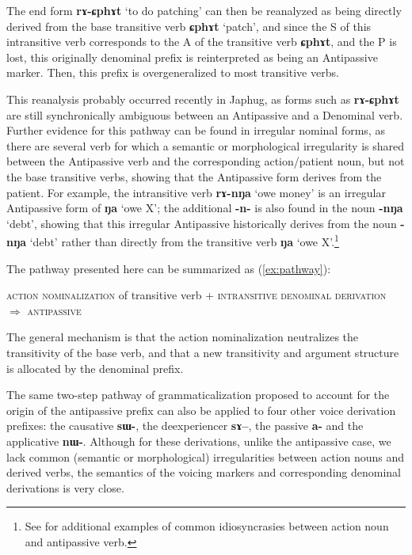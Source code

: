 \documentclass[oldfontcommands,oneside,a4paper,11pt]{article}
\newcommand{\ipa}[1]{\mbox{\phon\textbf{#1}}} %
\begin{document}
The end form \ipa{rɤ-ɕphɤt} `to do patching' can then be reanalyzed as being directly derived from the base transitive verb \ipa{ɕphɤt} `patch', and since the S of this intransitive verb corresponds to the A of the transitive verb \ipa{ɕphɤt}, and the P is lost, this originally denominal prefix is reinterpreted as being an Antipassive marker. Then, this prefix is overgeneralized to most transitive verbs.

This reanalysis probably occurred recently in Japhug, as forms such as \ipa{rɤ-ɕphɤt} are still synchronically ambiguous between an Antipassive and a Denominal verb. Further evidence for this pathway can be found in irregular nominal forms, as there are several verb for which a semantic or morphological irregularity is shared between the Antipassive verb and the corresponding action/patient noun, but not the base transitive verbs, showing that the Antipassive form derives from the patient. For example, the intransitive verb \ipa{rɤ-nŋa} `owe money' is an irregular Antipassive form of \ipa{ŋa} `owe X'; the additional \ipa{-n-} is also found in the noun \ipa{-nŋa} `debt', showing that this irregular Antipassive historically derives from the noun \ipa{-nŋa} `debt' rather than directly from the transitive verb \ipa{ŋa} `owe X'.\footnote{See \citet{jacques14antipassive} for additional examples of common idiosyncrasies between action noun and antipassive verb.}

The pathway presented here can be summarized as (\ref{ex:pathway}):

\begin{exe}
\ex \label{ex:pathway}
\glt \textsc{action nominalization} of transitive verb + \textsc{intransitive denominal derivation} $\Rightarrow$ \textsc{antipassive}
\end{exe}

The general mechanism is that the action nominalization neutralizes the transitivity of the base verb, and that a new transitivity and argument structure is allocated by the denominal prefix.

 The same two-step pathway of grammaticalization proposed to account for the origin of the antipassive prefix can also be applied to four other voice derivation prefixes: the causative \ipa{sɯ-}, the deexperiencer \ipa{sɤ--}, the passive \ipa{a-} and the applicative \ipa{nɯ-}. Although for these derivations, unlike the antipassive case, we lack common (semantic or morphological) irregularities between action nouns and derived verbs, the semantics of the voicing markers and corresponding denominal derivations is very close.
\end{document}
